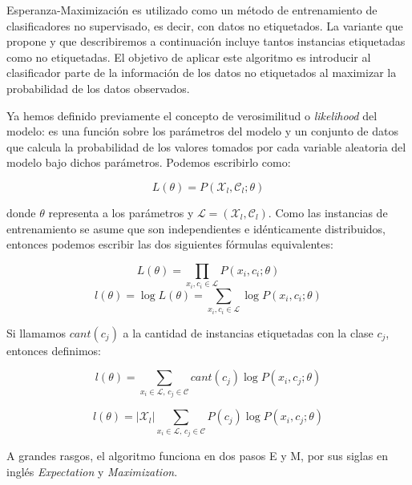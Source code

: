 Esperanza-Maximización es utilizado como un método de entrenamiento de clasificadores no supervisado, es decir, con datos no etiquetados. La variante que propone \citet{dualist} y que describiremos a continuación incluye tantos instancias etiquetadas como no etiquetadas. El objetivo de aplicar este algoritmo es introducir al clasificador parte de la información de los datos no etiquetados al maximizar la probabilidad de los datos observados.

Ya hemos definido previamente el concepto de verosimilitud o \textit{likelihood} del modelo: es una función sobre los parámetros del modelo y un conjunto de datos que calcula la probabilidad de los valores tomados por cada variable aleatoria del modelo bajo dichos parámetros. Podemos escribirlo como:

\begin{equation}
L(\theta) = P(\mathcal{X}_l, \mathcal{C}_l; \theta)
\end{equation}

donde $\theta$ representa a los parámetros y $\mathcal{L} = (\mathcal{X}_l, \mathcal{C}_l)$. Como las instancias de entrenamiento se asume que son independientes e idénticamente distribuidos, entonces podemos escribir las dos siguientes fórmulas equivalentes:

\begin{equation}
L(\theta) = \prod_{x_i, c_i \in \mathcal{L}} P(x_i, c_i; \theta)
\end{equation}
\begin{equation}
l(\theta) = \log L(\theta) = \sum_{x_i, c_i \in \mathcal{L}} \log P(x_i, c_i; \theta)
\end{equation}

Si llamamos $cant(c_j)$ a la cantidad de instancias etiquetadas con la clase $c_j$, entonces definimos:

\begin{equation}
l(\theta) = \sum_{x_i \in \mathcal{L}, \, c_j \in \mathcal{C}} cant(c_j) \log P(x_i, c_j; \theta)
\end{equation}

\begin{equation}\label{loglikelihood}
l(\theta) = |\mathcal{X}_l| \sum_{x_i \in \mathcal{L}, \, c_j \in \mathcal{C}} P(c_j) \log P(x_i, c_j; \theta)
\end{equation}

A grandes rasgos, el algoritmo funciona en dos pasos E y M, por sus siglas en inglés \textit{Expectation} y \textit{Maximization}.

